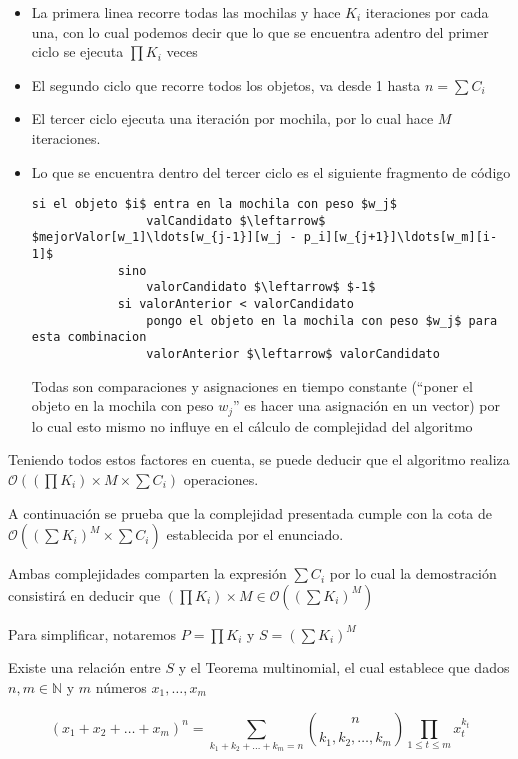 \begin{itemize}
\item La primera linea recorre todas las mochilas y hace $K_i$ iteraciones por cada una, con lo cual podemos decir que lo que se encuentra adentro del primer ciclo se ejecuta $\prod K_i$ veces

\item El segundo ciclo que recorre todos los objetos, va desde 1 hasta $n = \sum C_i$

\item El tercer ciclo ejecuta una iteración por mochila, por lo cual hace $M$ iteraciones.

\item Lo que se encuentra dentro del tercer ciclo es el siguiente fragmento de código

\begin{lstlisting}
si el objeto $i$ entra en la mochila con peso $w_j$
				valCandidato $\leftarrow$ $mejorValor[w_1]\ldots[w_{j-1}][w_j - p_i][w_{j+1}]\ldots[w_m][i-1]$
			sino
				valorCandidato $\leftarrow$ $-1$
			si valorAnterior < valorCandidato
				pongo el objeto en la mochila con peso $w_j$ para esta combinacion
				valorAnterior $\leftarrow$ valorCandidato
\end{lstlisting}

Todas son comparaciones y asignaciones en tiempo constante (``poner el objeto en la mochila con peso $w_j$'' es hacer una asignación en un vector) por lo cual esto mismo no influye en el cálculo de complejidad del algoritmo
\end{itemize}

Teniendo todos estos factores en cuenta, se puede deducir que el algoritmo realiza $\mathcal{O}((\prod K_i) \times M \times \sum C_i)$ operaciones.

A continuación se prueba que la complejidad presentada cumple con la cota de $\mathcal{O}((\sum K_i)^M \times \sum C_i)$ establecida por el enunciado.

Ambas complejidades comparten la expresión $\sum C_i$ por lo cual la demostración consistirá en deducir que $(\prod K_i) \times M \in \mathcal{O}((\sum K_i)^M)$

Para simplificar, notaremos $P = \prod K_i$ y $S = (\sum K_i)^M$

Existe una relación entre $S$ y el Teorema multinomial, el cual establece que dados $n, m \in \mathbb{N}$ y $m$ números $x_1, \ldots , x_m$

$$(x_1 + x_2 + \ldots + x_m)^n = \sum_{k_1 + k_2 + \ldots + k_m = n} \binom{n}{k_1, k_2, \ldots , k_m} \prod_{1 \leq t \leq m} x_t^{k_t}$$

